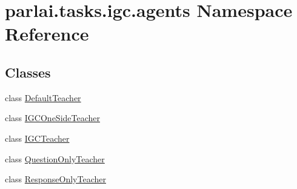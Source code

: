 \hypertarget{namespaceparlai_1_1tasks_1_1igc_1_1agents}{}\section{parlai.\+tasks.\+igc.\+agents Namespace Reference}
\label{namespaceparlai_1_1tasks_1_1igc_1_1agents}
\subsection*{Classes}
\begin{DoxyCompactItemize}
\item 
class \hyperlink{classparlai_1_1tasks_1_1igc_1_1agents_1_1DefaultTeacher}{Default\+Teacher}
\item 
class \hyperlink{classparlai_1_1tasks_1_1igc_1_1agents_1_1IGCOneSideTeacher}{I\+G\+C\+One\+Side\+Teacher}
\item 
class \hyperlink{classparlai_1_1tasks_1_1igc_1_1agents_1_1IGCTeacher}{I\+G\+C\+Teacher}
\item 
class \hyperlink{classparlai_1_1tasks_1_1igc_1_1agents_1_1QuestionOnlyTeacher}{Question\+Only\+Teacher}
\item 
class \hyperlink{classparlai_1_1tasks_1_1igc_1_1agents_1_1ResponseOnlyTeacher}{Response\+Only\+Teacher}
\end{DoxyCompactItemize}
